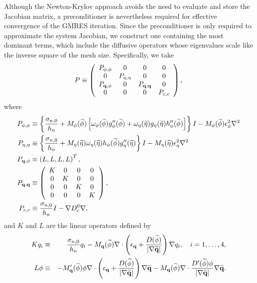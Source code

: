Although the Newton-Krylov approach avoids the need to evaluate and
store the Jacobian matrix, a preconditioner is nevertheless required
for effective convergence of the GMRES iteration.  Since the
preconditioner is only required to approximate the system Jacobian, we
construct one containing the most dominant terms, which include the
diffusive operators whose eigenvalues scale like the inverse square of
the mesh size.  Specifically, we take
%
\begin{equation}
  P \equiv \left (
    \begin{array}{cccc}
      P_{\phi,\phi} & 0 & 0 & 0 \\
      0 & P_{\eta,\eta} & 0 & 0 \\
      P_{{\bf q},\phi} & 0 & P_{{\bf q},{\bf q}} & 0 \\
      0 & 0 & 0 & P_{c,c}
    \end{array}
  \right ),
\label{eq:Pdef}
\end{equation}
%
where
%
\begin{align}
  P_{\phi,\phi} & \equiv \left \{ \frac{\sigma_{n,0}}{h_n} + 
    M_\phi(\widetilde{\phi}) \left[ \omega_\phi(\widetilde{\phi})
      g''_\phi(\widetilde{\phi}) +
      \omega_\eta(\widetilde{\eta}) g_\eta(\widetilde{\eta})
      h''_\phi(\widetilde{\phi}) \right]
    \right \} I - M_\phi(\widetilde{\phi}) \epsilon_{\phi}^2 \nabla^2 \\
  P_{\eta,\eta} & \equiv \left \{ \frac{\sigma_{n,0}}{h_n} + 
    M_\eta(\widetilde{\eta}) \omega_\eta(\widetilde{\eta})
    h_\phi(\widetilde{\phi}) g''_\eta(\widetilde{\eta})
    \right \} I - M_\eta(\widetilde{\eta}) \epsilon_{\eta}^2 \nabla^2 \\
  P_{{\bf q},\phi} & \equiv \left (
    L, L, L, L \right )^T, \\
  P_{{\bf q},{\bf q}} & \equiv \left (
    \begin{array}{cccc}
      K & 0 & 0 & 0 \\
      0 & K & 0 & 0 \\
      0 & 0 & K & 0 \\
      0 & 0 & 0 & K
    \end{array}
    \right ), \\
  P_{c,c} & \equiv \frac{\sigma_{n,0}}{h_n} I - \nabla D_c^0\nabla,
\end{align}
%
and $K$ and $L$ are the linear operators defined by
%
\begin{eqnarray}
  Kq_i &\equiv & \frac{\sigma_{n,0}}{h_n} q_i - M_{\bf q}
    (\widetilde{\phi}) \nabla \cdot \left (
    \epsilon_{\bf q} +
    \frac{D ( \widetilde{\phi} ) }
    { | \nabla \widetilde{\bf q} | } \right )
    \nabla q_i, \hspace{1em} i = 1, \ldots, 4, \\
  L\phi &\equiv& 
    - M'_{\bf q} ( \widetilde{\phi} ) \phi \nabla \cdot
    \left( \epsilon_{\bf q} +
    \frac{D ( \widetilde{\phi} ) }
    { | \nabla \widetilde{\bf q} | }
    \right) \nabla \widetilde{\bf q}
    - M_{\bf q} ( \widetilde{\phi} ) \nabla \cdot 
    \frac{D'(\widetilde{\phi}) \phi}{ | \nabla \widetilde{\bf q} | }
    \nabla \widetilde{\bf q}.
\end{eqnarray}
